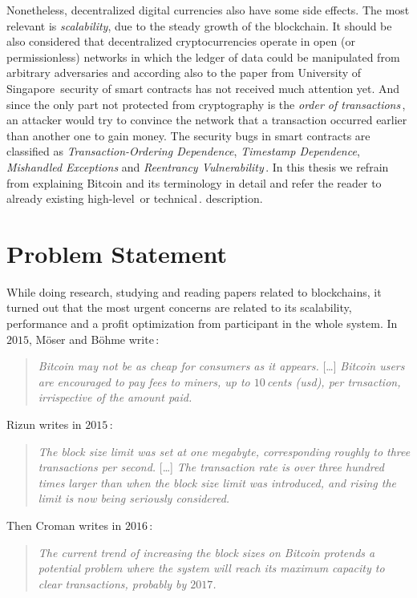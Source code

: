 \documentclass[USenglish]{uit-thesis}
\begin{document}
Nonetheless, decentralized digital currencies also have some side effects.
The most relevant is \emph{scalability}, due to the steady growth of the
blockchain. It should be also considered that
decentralized cryptocurrencies operate in open (or permissionless) networks
in which the ledger of data could be manipulated from arbitrary adversaries and
according also to the paper from University of Singapore\,\cite{Luu:2016}
security of smart contracts has not received much attention yet. And since the
only part not protected from cryptography
is the \emph{order of transactions}\,\cite{ethereum_white_paper},
an attacker would try to convince the network that a transaction
occurred earlier than another one to gain money.
The security bugs in smart contracts are classified as \emph{Transaction-Ordering Dependence},
\emph{Timestamp Dependence}, \emph{Mishandled Exceptions}
and \emph{Reentrancy Vulnerability}\,\cite{Luu:2016}.
In this thesis we refrain from explaining Bitcoin and its terminology in detail
and refer the reader to already existing high-level\,\cite{Underwood:2016:BBB,
Bohme2015BETG}
or technical\,\cite{Nakamoto_bitcoin, ethereum_white_paper}.
 description.
\section{Problem Statement}
\label{sec:probdefinition}
While doing research, studying and reading papers related to blockchains,
it turned out that the most urgent concerns are related to
its scalability, performance and a profit optimization from participant
in the whole system.
In $2015$, Möser and Böhme write\,\cite{Moser2015}:
\begin{quote}
	\emph{Bitcoin may not be as cheap for consumers as it appears.}
	[\dots]
	\emph{Bitcoin users are encouraged to pay fees to miners, up
	to $10$\,cents (\gls{usd}), per trnsaction, irrispective of the amount
paid.}
\end{quote}

Rizun writes in $2015$\,\cite{Rizun:2015:blocksizelimit}:
\begin{quote}
	\emph{The block size limit was set at one megabyte, corresponding
		roughly to three transactions per second.}
		[\dots]
		\emph{The transaction rate is over three hundred times larger
		than when the block size limit was introduced, and rising the limit
		is now being seriously considered.}
\end{quote}
Then Croman writes in $2016$\,\cite{croman2016}:
\begin{quote}
\emph{The current trend of increasing the block sizes on Bitcoin protends
a potential problem where the system will reach its maximum capacity to clear
transactions, probably by $2017$.}
\end{quote}
\end{document}
